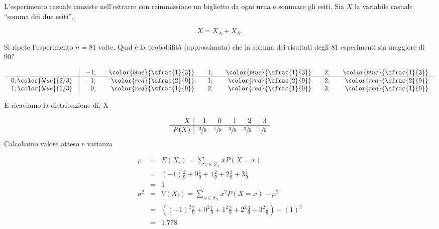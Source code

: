 \documentclass[
  11pt,
]{book}
\theoremstyle{mytheoremstyle}
\theoremstyle{mydefstyle}
\newenvironment{sol}
  {
  \begin{tcolorbox}[enhanced,breakable,arc=0.1mm,boxrule=1pt,colback=white,colframe=iblue,
  title=\bf \fontfamily{lmss}\selectfont \hspace{.5 cm} Soluzione,drop fuzzy shadow]

}{
\end{tcolorbox}
  }
\begin{document}
L'esperimento casuale consiste nell'estrarre con reimmissione un
biglietto da ogni urna e sommare gli esiti. Sia \(X\) la variabile casuale
``somma dei due esiti'',

\[X=X_{A} + X_{B}.\]

Si ripete l'esperimento \(n=81\) volte. Qual è la probabilità
(approssimata) che la somma dei risultati degli 81 esperimenti sia
maggiore di 90?

\begin{sol}

\normalsize

\[\arraycolsep=10pt\def\arraystretch{1}\begin{array}{ r|rrrrrr }
& -1 ;&\color{blue}{ \sfrac{ 1 } { 3 }} & 1 ;&\color{blue}{ \sfrac{ 1 } { 3 }} & 2 ;&\color{blue}{ \sfrac{ 1 } { 3 }} \\ 
\hline 
0 ;\color{blue}{ 2 / 3 }& -1;&\color{red}{\sfrac{2}{9}}& 1;&\color{red}{\sfrac{2}{9}}& 2;&\color{red}{\sfrac{2}{9}}\\ 
1 ;\color{blue}{ 1 / 3 }& 0;&\color{red}{\sfrac{1}{9}}& 2;&\color{red}{\sfrac{1}{9}}& 3;&\color{red}{\sfrac{1}{9}}\\ 
\end{array}
 \]

\normalsize E ricaviamo la distribuzione di, X

\normalsize

\[
     \begin{array}{ r|rrrrr }
 X  & -1& 0& 1& 2& 3 \\ 
 \hline 
 P( X ) & \sfrac{2}{9}& \sfrac{1}{9}& \sfrac{2}{9}& \sfrac{3}{9}& \sfrac{1}{9} \\ 
 \end{array}
 \]
\normalsize Calcoliamo valore atteso e varianza

\normalsize

\begin{eqnarray*} \mu &=& E(X_i) = \sum_{x\in S_X}x P(X=x)\\ 
 &=& ( -1 ) \frac { 2 }{ 9 }+ 0  \frac { 1 }{ 9 }+ 1  \frac { 2 }{ 9 }+ 2  \frac { 3 }{ 9 }+ 3  \frac { 1 }{ 9 } \\ 
            &=& 1 \\ 
 \sigma^2 &=& V(X_i) = \sum_{x\in S_X}x^2 P(X=x)-\mu^2\\ 
 &=&\left( ( -1 ) ^2\frac { 2 }{ 9 }+ 0  ^2\frac { 1 }{ 9 }+ 1  ^2\frac { 2 }{ 9 }+ 2  ^2\frac { 3 }{ 9 }+ 3  ^2\frac { 1 }{ 9 } \right)-( 1 )^2\\ 
            &=& 1.778 
\end{eqnarray*}
\normalsize


\end{sol}
\end{document}
